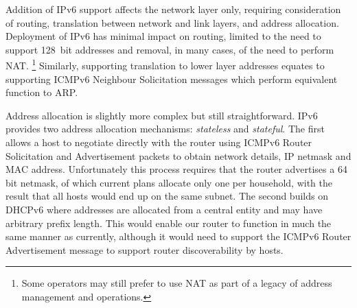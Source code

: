 Addition of IPv6 support affects the network layer only, requiring consideration
of routing, translation between network and link layers, and address
allocation.  Deployment of IPv6 has minimal impact on routing, limited to the
need to support 128~bit addresses and removal, in many cases, of the need to
perform NAT.  \footnote{Some operators may still prefer to use NAT as part of a
  legacy of address management and operations.}  Similarly, supporting
translation to lower layer addresses equates to supporting ICMPv6 Neighbour
Solicitation messages which perform equivalent function to ARP.


Address allocation is slightly more complex but still straightforward.  IPv6
provides two address allocation mechanisms: \emph{stateless} and
\emph{stateful}.  The first allows a host to negotiate directly with the router
using ICMPv6 Router Solicitation and Advertisement packets to obtain network
details, IP netmask and MAC address.  Unfortunately this process requires that
the router advertises a 64 bit netmask, of which current plans allocate only one
per household, with the result that all hosts would end up on the same subnet.
The second builds on DHCPv6 where addresses are allocated from a central entity
and may have arbitrary prefix length.  This would enable our router to function
in much the same manner as currently, although it would need to support the
ICMPv6 Router Advertisement message to support router discoverability by hosts. 

